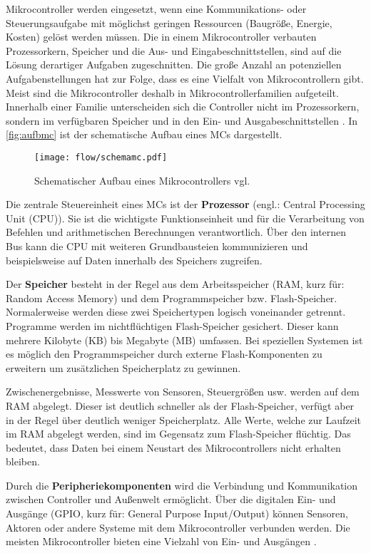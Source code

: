 Mikrocontroller werden eingesetzt, wenn eine Kommunikations- oder Steuerungsaufgabe mit möglichst geringen Ressourcen (Baugröße, Energie, Kosten) gelöst werden müssen. Die in einem Mikrocontroller verbauten Prozessorkern, Speicher und die Aus- und Eingabeschnittstellen, sind auf die Lösung derartiger Aufgaben zugeschnitten. Die große Anzahl an potenziellen Aufgabenstellungen hat zur Folge, dass es eine Vielfalt von Mikrocontrollern gibt. Meist sind die Mikrocontroller deshalb in Mikrocontrollerfamilien aufgeteilt. Innerhalb einer Familie unterscheiden sich die Controller nicht im Prozessorkern, sondern im verfügbaren Speicher und in den Ein- und Ausgabeschnittstellen \cite{ECHT2005}. In \autoref{fig:aufbmc} ist der schematische Aufbau eines MCs dargestellt.
\begin{figure}[th]
	\centering
		\texttt{[image: flow/schemamc.pdf]}
	\caption{Schematischer Aufbau eines Mikrocontrollers vgl. \cite{Brinkschulte:2002:Mikrocontroller}}
	\label{fig:aufbmc}
\end{figure}

Die zentrale Steuereinheit eines MCs ist der \textbf{Prozessor} (engl.: Central Processing Unit (CPU)). Sie ist die wichtigste Funktionseinheit und für die Verarbeitung von Befehlen und arithmetischen Berechnungen verantwortlich. Über den internen Bus kann die CPU mit weiteren Grundbausteien kommunizieren und beispielsweise auf Daten innerhalb des Speichers zugreifen.

Der \textbf{Speicher} besteht in der Regel aus dem Arbeitsspeicher (RAM, kurz für: Random Access Memory) und dem Programmspeicher bzw. Flash-Speicher. Normalerweise werden diese zwei Speichertypen logisch voneinander getrennt. Programme werden im nichtflüchtigen Flash-Speicher gesichert. Dieser kann mehrere Kilobyte (KB) bis Megabyte (MB) umfassen. Bei speziellen Systemen ist es möglich den Programmspeicher durch externe Flash-Komponenten zu erweitern um zusätzlichen Speicherplatz zu gewinnen.

Zwischenergebnisse, Messwerte von Sensoren, Steuergrößen usw. werden auf dem RAM abgelegt. Dieser ist deutlich schneller als der Flash-Speicher, verfügt aber in der Regel über deutlich weniger Speicherplatz. Alle Werte, welche zur Laufzeit im RAM abgelegt werden, sind im Gegensatz zum Flash-Speicher flüchtig. Das bedeutet, dass Daten bei einem Neustart des Mikrocontrollers nicht erhalten bleiben.

Durch die \textbf{Peripheriekomponenten} wird die Verbindung und Kommunikation zwischen Controller und Außenwelt ermöglicht. Über die digitalen Ein- und Ausgänge (GPIO, kurz für: General Purpose Input/Output) können Sensoren, Aktoren oder andere Systeme mit dem Mikrocontroller verbunden werden. Die meisten Mikrocontroller bieten eine Vielzahl von Ein- und Ausgängen \cite{Brinkschulte:2002:Mikrocontroller}.


